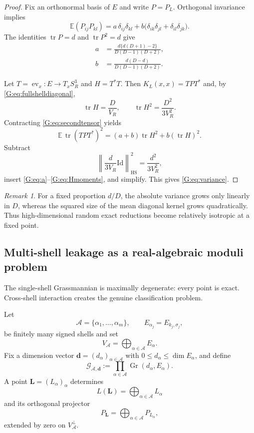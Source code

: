 \documentclass[
 aps,
 prd,
 reprint,
 amsmath,
 amssymb,
 nofootinbib,
 superscriptaddress
]{revtex4-2}
\theoremstyle{definition}
\theoremstyle{remark}
\newtheorem{remark}[theorem]{Remark}
\newcommand{\Sthree}{S^3_R}
\newcommand{\cG}{\mathcal G}
\newcommand{\Id}{\mathrm{Id}}
\newcommand{\Gr}{\operatorname{Gr}}
\newcommand{\HS}{\mathrm{HS}}
\newcommand{\tr}{\operatorname{tr}}
\begin{document}
\begin{proof}
Fix an orthonormal basis of $E$ and write $P=P_L$.  Orthogonal invariance
implies
\begin{equation}
 \mathbb E(P_{ij}P_{kl})
 =
 a\,\delta_{ij}\delta_{kl}
 +
 b\bigl(
 \delta_{ik}\delta_{jl}
 +
 \delta_{il}\delta_{jk}
 \bigr).
 \label{G:eq:secondtensor}
\end{equation}
The identities
$\tr P=d$ and $\tr P^2=d$ give
\begin{align}
 a&=
 \frac{d\{d(D+1)-2\}}
 {D(D-1)(D+2)},
 \label{G:eq:a}\\
 b&=
 \frac{d(D-d)}
 {D(D-1)(D+2)}.
 \label{G:eq:b}
\end{align}

Let $T=\operatorname{ev}_x:E\to T_x\Sthree$ and
$H=T^*T$.  Then
$K_L(x,x)=TPT^*$ and, by \eqref{G:eq:fullshelldiagonal},
\begin{equation}
 \tr H=\frac{D}{V_R},
 \qquad
 \tr H^2=\frac{D^2}{3V_R^2}.
 \label{G:eq:Hmoments}
\end{equation}
Contracting \eqref{G:eq:secondtensor} yields
\begin{equation}
 \mathbb E\,\tr(TPT^*)^2
 =
 (a+b)\tr H^2+b(\tr H)^2.
 \label{G:eq:Ksecond}
\end{equation}
Subtract
\[
 \left\|
 \frac{d}{3V_R}\Id
 \right\|_{\HS}^2
 =
 \frac{d^2}{3V_R^2},
\]
insert \eqref{G:eq:a}--\eqref{G:eq:Hmoments}, and simplify.  This gives
\eqref{G:eq:variance}.
\end{proof}

\begin{remark}
For a fixed proportion $d/D$, the absolute variance grows only linearly in
$D$, whereas the squared size of the mean diagonal kernel grows
quadratically.  Thus high-dimensional random exact reductions become
relatively isotropic at a fixed point.
\end{remark}

\subsection{Multi-shell leakage as a real-algebraic moduli problem}

The single-shell Grassmannian is maximally degenerate: every point is exact.
Cross-shell interaction creates the genuine classification problem.

Let
\[
 \mathcal A=\{\alpha_1,\ldots,\alpha_m\},
 \qquad
 E_{\alpha_j}=E_{k_j,\sigma_j},
\]
be finitely many signed shells and set
\[
        V_{\mathcal A}
        =
        \bigoplus_{\alpha\in\mathcal A}E_\alpha.
\]
Fix a dimension vector
$\mathbf d=(d_\alpha)_{\alpha\in\mathcal A}$ with
$0\le d_\alpha\le\dim E_\alpha$, and define
\begin{equation}
 \cG_{\mathcal A,\mathbf d}
 :=
 \prod_{\alpha\in\mathcal A}
 \Gr(d_\alpha,E_\alpha).
 \label{G:eq:productgrass}
\end{equation}
A point
$\mathbf L=(L_\alpha)_\alpha$
determines
\[
        L(\mathbf L)
        =
        \bigoplus_{\alpha\in\mathcal A}L_\alpha
\]
and its orthogonal projector
\[
        P_{\mathbf L}
        =
        \bigoplus_{\alpha\in\mathcal A}P_{L_\alpha},
\]
extended by zero on $V_{\mathcal A}^\perp$.
\end{document}
